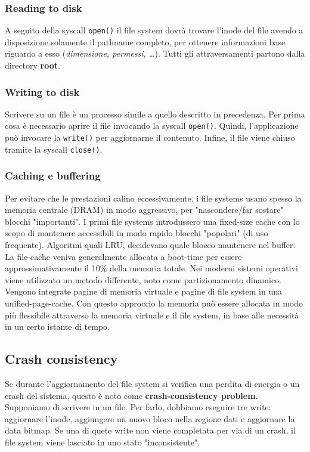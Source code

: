 \documentclass[12pt, twoside, letterpaper]{article}
\begin{document}
			\subsubsection{Reading to disk}
				A seguito della syscall \texttt{open()} il file system dovrà trovare l'inode del file avendo a disposizione solamente il pathname completo, per ottenere informazioni base riguardo a esso (\textit{dimensione, permessi, \dots}). Tutti gli attraversamenti partono dalla directory \textbf{root}. 
				
			\subsubsection{Writing to disk}
				Scrivere su un file è un processo simile a quello descritto in precedenza. Per prima cosa è necessario aprire il file invocando la syscall \texttt{open()}. Quindi, l’applicazione può invocare la \texttt{write()} per aggiornarne il contenuto. Infine, il file viene chiuso tramite la syscall \texttt{close()}. 
				
			\subsubsection{Caching e buffering}
				Per evitare che le prestazioni calino eccessivamente, i file systems usano spesso la memoria centrale (DRAM) in modo aggressivo, per "nascondere/far sostare" blocchi "importanti". I primi file systems introdussero una fixed-size cache con lo scopo di mantenere accessibili in modo rapido blocchi "popolari" (di uso frequente). Algoritmi quali LRU, decidevano quale blocco mantenere nel buffer. La file-cache veniva generalmente allocata a boot-time per essere approssimativamente il 10\% della memoria totale. Nei moderni sistemi operativi viene utilizzato un metodo differente, noto come partizionamento dinamico. Vengono integrate pagine di memoria virtuale e pagine di file system in una unified-page-cache. Con questo approccio la memoria può essere allocata in modo più flessibile attraverso la memoria virtuale e il file system, in base alle necessità in un certo istante di tempo.
				
		
		\subsection{Crash consistency}
			Se durante l'aggiornamento del file system si verifica una perdita di energia o un crash del sistema, questo è noto come \textbf{crash-consistency problem}. Supponiamo di scrivere in un file. Per farlo, dobbiamo eseguire tre write: aggiornare l'inode, aggiungere un nuovo bloco nella regione dati e aggiornare la data bitmap. Se una di quete write non viene completata per via di un crash, il file system viene lasciato in uno stato "inconsistente". 
			
\end{document}
